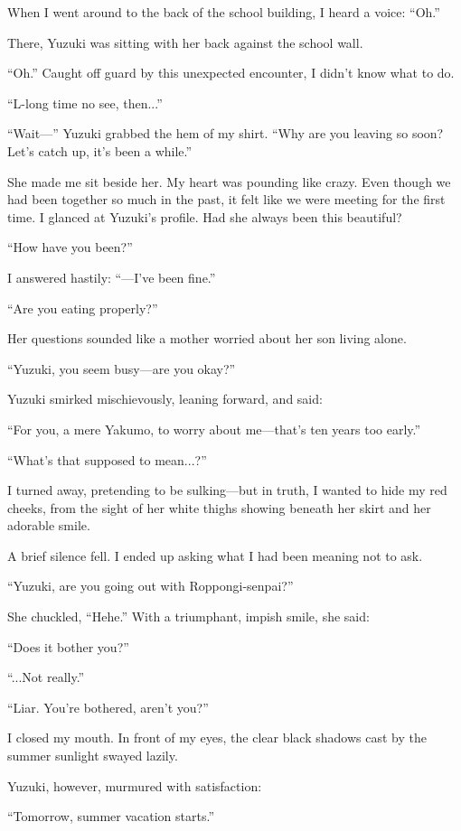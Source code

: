 \documentclass[
    a4paper,
    12pt,
    twoside,
    openany,
    UTF8,
    fontset=windows
]{ctexbook}
\begin{document}
When I went around to the back of the school building, I heard a voice: ``Oh.''

There, Yuzuki was sitting with her back against the school wall.

``Oh.'' Caught off guard by this unexpected encounter, I didn't know what to do.

``L-long time no see, then...''

``Wait---'' Yuzuki grabbed the hem of my shirt. ``Why are you leaving so soon? Let's catch up, it's been a while.''

She made me sit beside her. My heart was pounding like crazy. Even though we had been together so much in the past, it felt like we were meeting for the first time. I glanced at Yuzuki's profile. Had she always been this beautiful?

``How have you been?''

I answered hastily: ``---I've been fine.''

``Are you eating properly?''

Her questions sounded like a mother worried about her son living alone.

``Yuzuki, you seem busy---are you okay?''

Yuzuki smirked mischievously, leaning forward, and said:

``For you, a mere Yakumo, to worry about me---that's ten years too early.''

``What's that supposed to mean...?''

I turned away, pretending to be sulking---but in truth, I wanted to hide my red cheeks, from the sight of her white thighs showing beneath her skirt and her adorable smile.

A brief silence fell. I ended up asking what I had been meaning not to ask.

``Yuzuki, are you going out with Roppongi-senpai?''

She chuckled, ``Hehe.'' With a triumphant, impish smile, she said:

``Does it bother you?''

``...Not really.''

``Liar. You're bothered, aren't you?''

I closed my mouth. In front of my eyes, the clear black shadows cast by the summer sunlight swayed lazily.

Yuzuki, however, murmured with satisfaction:

``Tomorrow, summer vacation starts.''
\end{document}
